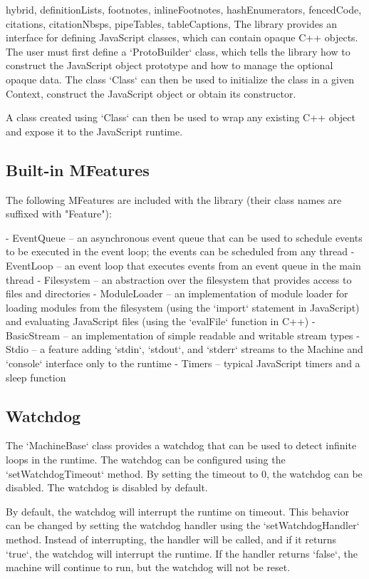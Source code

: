 \begin{markdown*}{%
  hybrid,
  definitionLists,
  footnotes,
  inlineFootnotes,
  hashEnumerators,
  fencedCode,
  citations,
  citationNbsps,
  pipeTables,
  tableCaptions,
}
The library provides an interface for defining JavaScript classes, which can contain opaque C++ objects. The user must first define a `ProtoBuilder` class, which tells the library how to construct the JavaScript object prototype and how to manage the optional opaque data. The class `Class` can then be used to initialize the class in a given Context, construct the JavaScript object or obtain its constructor.

A class created using `Class` can then be used to wrap any existing C++ object and expose it to the JavaScript runtime.

\subsection{Built-in MFeatures}

The following MFeatures are included with the library (their class names are suffixed with "Feature"):

  - EventQueue -- an asynchronous event queue that can be used to schedule events to be executed in the event loop; the events can be scheduled from any thread
  - EventLoop -- an event loop that executes events from an event queue in the main thread
  - Filesystem -- an abstraction over the filesystem that provides access to files and directories
  - ModuleLoader -- an implementation of module loader for loading modules from the filesystem (using the `import` statement in JavaScript) and evaluating JavaScript files (using the `evalFile` function in C++)
  - BasicStream -- an implementation of simple readable and writable stream types
  - Stdio -- a feature adding `stdin`, `stdout`, and `stderr` streams to the Machine and `console` interface only to the runtime
  - Timers -- typical JavaScript timers and a sleep function

\subsection{Watchdog}

The `MachineBase` class provides a watchdog that can be used to detect infinite loops in the runtime. The watchdog can be configured using the `setWatchdogTimeout` method. By setting the timeout to 0, the watchdog can be disabled. The watchdog is disabled by default.

By default, the watchdog will interrupt the runtime on timeout. This behavior can be changed by setting the watchdog handler using the `setWatchdogHandler` method. Instead of interrupting, the handler will be called, and if it returns `true`, the watchdog will interrupt the runtime. If the handler returns `false`, the machine will continue to run, but the watchdog will not be reset.



\end{markdown*}
